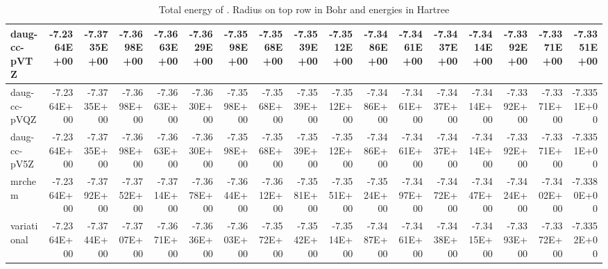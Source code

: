 \documentclass[../master_thesis.tex]{subfiles}
\begin{document}
\begin{table}
{{\begin{tabular}{|l|r|r|r|r|r|r|r|r|r|r|r|r|r|r|r|r|}
daug-cc-pVTZ & -7.2364E+00 & -7.3735E+00 & -7.3698E+00 & -7.3663E+00 & -7.3629E+00 & -7.3598E+00 & -7.3568E+00 & -7.3539E+00 & -7.3512E+00 & -7.3486E+00 & -7.3461E+00 & -7.3437E+00 & -7.3414E+00 & -7.3392E+00 & -7.3371E+00 & -7.3351E+00 \\ \hline
daug-cc-pVQZ & -7.2364E+00 & -7.3735E+00 & -7.3698E+00 & -7.3663E+00 & -7.3630E+00 & -7.3598E+00 & -7.3568E+00 & -7.3539E+00 & -7.3512E+00 & -7.3486E+00 & -7.3461E+00 & -7.3437E+00 & -7.3414E+00 & -7.3392E+00 & -7.3371E+00 & -7.3351E+00 \\ \hline
daug-cc-pV5Z & -7.2364E+00 & -7.3735E+00 & -7.3698E+00 & -7.3663E+00 & -7.3630E+00 & -7.3598E+00 & -7.3568E+00 & -7.3539E+00 & -7.3512E+00 & -7.3486E+00 & -7.3461E+00 & -7.3437E+00 & -7.3414E+00 & -7.3392E+00 & -7.3371E+00 & -7.3351E+00 \\ \hline
mrchem & -7.2364E+00 & -7.3792E+00 & -7.3752E+00 & -7.3714E+00 & -7.3678E+00 & -7.3644E+00 & -7.3612E+00 & -7.3581E+00 & -7.3551E+00 & -7.3524E+00 & -7.3497E+00 & -7.3472E+00 & -7.3447E+00 & -7.3424E+00 & -7.3402E+00 & -7.3380E+00 \\ \hline
variational & -7.2364E+00 & -7.3744E+00 & -7.3707E+00 & -7.3671E+00 & -7.3636E+00 & -7.3603E+00 & -7.3572E+00 & -7.3542E+00 & -7.3514E+00 & -7.3487E+00 & -7.3461E+00 & -7.3438E+00 & -7.3415E+00 & -7.3393E+00 & -7.3372E+00 & -7.3352E+00 \\ \hline
\end{tabular}}}{\caption{Total energy of . Radius on top row in Bohr and energies in Hartree}
\label{tab:rawLipdata}}

\end{table}
\end{document}
